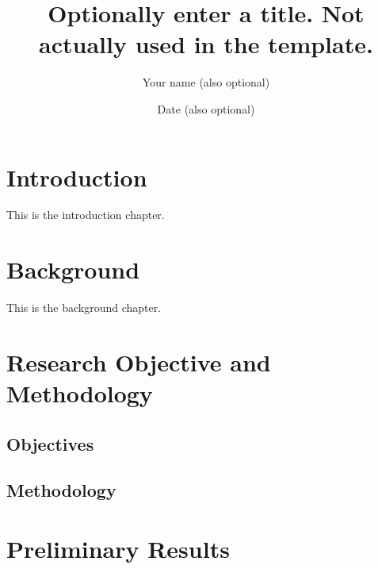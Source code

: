 \documentclass[12pt]{article}
\title{Optionally enter a title. Not actually used in the template.}
\author{Your name (also optional)}
\date{Date (also optional)}
\begin{document}

\clearpage



\clearpage

\begin{abstract}
\end{abstract}

\newpage

\listoffigures

\newpage

\tableofcontents

\newpage

\section{Introduction}
\label{sec_intro}

This is the introduction chapter.


\section{Background}
\label{sec_background}

This is the background chapter.

\section{Research Objective and Methodology}
\subsection{Objectives}
    \label{sec_objectives}

\subsection{Methodology}
    \label{sec_methodology}





\section{Preliminary Results}




\end{document}
